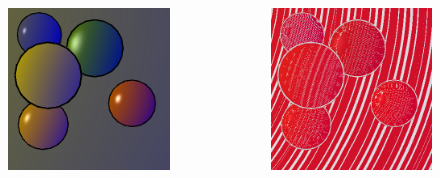 \documentclass{beamer}
\begin{document}
\begin{frame}
\begin{columns}[T]
\begin{column}{.3\textwidth}
\begin{figure}
				\includegraphics[width=\textwidth]{res.png}
			\end{figure}
		\end{column}
		\begin{column}{.3\textwidth}
			\begin{figure}
				\includegraphics[width=\textwidth]{diff.png}
			\end{figure}
		\end{column}
\end{columns}
\end{frame}
\end{document}
